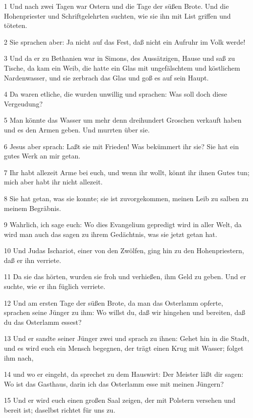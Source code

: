 \par 1 Und nach zwei Tagen war Ostern und die Tage der süßen Brote. Und die Hohenpriester und Schriftgelehrten suchten, wie sie ihn mit List griffen und töteten.
\par 2 Sie sprachen aber: Ja nicht auf das Fest, daß nicht ein Aufruhr im Volk werde!
\par 3 Und da er zu Bethanien war in Simons, des Aussätzigen, Hause und saß zu Tische, da kam ein Weib, die hatte ein Glas mit ungefälschtem und köstlichem Nardenwasser, und sie zerbrach das Glas und goß es auf sein Haupt.
\par 4 Da waren etliche, die wurden unwillig und sprachen: Was soll doch diese Vergeudung?
\par 5 Man könnte das Wasser um mehr denn dreihundert Groschen verkauft haben und es den Armen geben. Und murrten über sie.
\par 6 Jesus aber sprach: Laßt sie mit Frieden! Was bekümmert ihr sie? Sie hat ein gutes Werk an mir getan.
\par 7 Ihr habt allezeit Arme bei euch, und wenn ihr wollt, könnt ihr ihnen Gutes tun; mich aber habt ihr nicht allezeit.
\par 8 Sie hat getan, was sie konnte; sie ist zuvorgekommen, meinen Leib zu salben zu meinem Begräbnis.
\par 9 Wahrlich, ich sage euch: Wo dies Evangelium gepredigt wird in aller Welt, da wird man auch das sagen zu ihrem Gedächtnis, was sie jetzt getan hat.
\par 10 Und Judas Ischariot, einer von den Zwölfen, ging hin zu den Hohenpriestern, daß er ihn verriete.
\par 11 Da sie das hörten, wurden sie froh und verhießen, ihm Geld zu geben. Und er suchte, wie er ihn füglich verriete.
\par 12 Und am ersten Tage der süßen Brote, da man das Osterlamm opferte, sprachen seine Jünger zu ihm: Wo willst du, daß wir hingehen und bereiten, daß du das Osterlamm essest?
\par 13 Und er sandte seiner Jünger zwei und sprach zu ihnen: Gehet hin in die Stadt, und es wird euch ein Mensch begegnen, der trägt einen Krug mit Wasser; folget ihm nach,
\par 14 und wo er eingeht, da sprechet zu dem Hauswirt: Der Meister läßt dir sagen: Wo ist das Gasthaus, darin ich das Osterlamm esse mit meinen Jüngern?
\par 15 Und er wird euch einen großen Saal zeigen, der mit Polstern versehen und bereit ist; daselbst richtet für uns zu.
